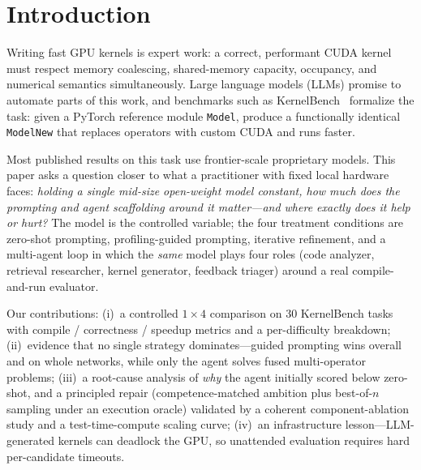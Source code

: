 \documentclass[conference]{IEEEtran}
\begin{document}
\vspace{0.5em}
\noindent{}

\section{Introduction}

Writing fast GPU kernels is expert work: a correct, performant CUDA kernel must
respect memory coalescing, shared-memory capacity, occupancy, and numerical
semantics simultaneously. Large language models (LLMs) promise to automate parts of
this work, and benchmarks such as KernelBench~\cite{kernelbench} formalize the task:
given a PyTorch reference module \texttt{Model}, produce a functionally identical
\texttt{ModelNew} that replaces operators with custom CUDA and runs faster.

Most published results on this task use frontier-scale proprietary models. This
paper asks a question closer to what a practitioner with fixed local hardware faces:
\emph{holding a single mid-size open-weight model constant, how much does the
prompting and agent scaffolding around it matter---and where exactly does it help or
hurt?} The model is the controlled variable; the four treatment conditions are
zero-shot prompting, profiling-guided prompting, iterative refinement, and a
multi-agent loop in which the \emph{same} model plays four roles (code analyzer,
retrieval researcher, kernel generator, feedback triager) around a real
compile-and-run evaluator.

Our contributions: (i)~a controlled $1{\times}4$ comparison on 30 KernelBench tasks
with compile / correctness / speedup metrics and a per-difficulty breakdown;
(ii)~evidence that no single strategy dominates---guided prompting wins overall and
on whole networks, while only the agent solves fused multi-operator problems;
(iii)~a root-cause analysis of \emph{why} the agent initially scored below
zero-shot, and a principled repair (competence-matched ambition plus best-of-$n$
sampling under an execution oracle) validated by a coherent component-ablation
study and a test-time-compute scaling curve; (iv)~an infrastructure lesson---LLM-generated
kernels can deadlock the GPU, so unattended evaluation requires hard
per-candidate timeouts.
\end{document}
